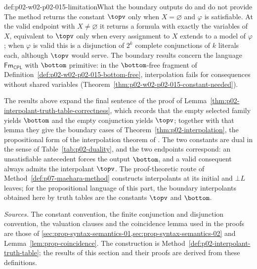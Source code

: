 \begin{hbwarning}{def:p02-w02-p02-015-limitation}{What the boundary outputs do and do not provide}
The method returns the constant \(\topv\) only when \(X=\varnothing\) and
\(\varphi\) is satisfiable.  At the valid endpoint with \(X\neq\varnothing\)
it returns a formula with exactly the variables of \(X\), equivalent to
\(\topv\) only when every assignment to \(X\) extends to a model of
\(\varphi\); when \(\varphi\) is valid this is a disjunction of \(2^{k}\)
complete conjunctions of \(k\) literals each, although \(\topv\) would serve.
The boundary results concern the language \(\mathsf{Fm}_{\mathsf{CPL}}\) with \(\bottom\)
primitive: in the \(\bottom\)-free fragment of
Definition~\ref{def:p02-w02-p02-015-bottom-free}, interpolation fails for
consequences without shared variables
(Theorem~\ref{thm:p02-w02-p02-015-constant-needed}).
\end{hbwarning}

The results above expand the final sentence of the proof of
Lemma~\ref{thm:p02-interpolant-truth-table-correctness}, which records that the
empty selected family yields \(\bottom\) and the empty conjunction yields
\(\topv\); together with that lemma they give the boundary cases of
Theorem~\ref{thm:p02-interpolation}, the propositional form of the
interpolation theorem of \textcite{Craig1957}.  The two constants are dual in the sense
of Table~\ref{tab:p02-duality}, and the two endpoints correspond: an
unsatisfiable antecedent forces the output \(\bottom\), and a valid consequent
always admits the interpolant \(\topv\).  The proof-theoretic route of
Method~\ref{def:p07-maehara-method} constructs interpolants at its initial and
\(\bot L\) leaves; for the propositional language of this part, the
boundary interpolants obtained here by truth tables are the constants
\(\topv\) and \(\bottom\).

\emph{Sources.} The constant convention, the finite conjunction and
disjunction convention, the valuation clauses and the coincidence lemma used
in the proofs are those of
\cref{sec:prop-syntax-semantics-01,sec:prop-syntax-semantics-02} and
Lemma~\ref{lem:prop-coincidence}.  The construction is
Method~\ref{def:p02-interpolant-truth-table}; the results of this section and
their proofs are derived from these definitions.

